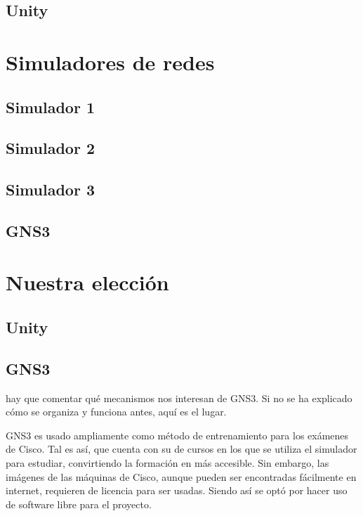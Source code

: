 \subsection{Unity}


\section{Simuladores de redes}

\subsection{Simulador 1}

\subsection{Simulador 2}

\subsection{Simulador 3}

\subsection{GNS3}

\section{Nuestra elección}

\subsection{Unity}

\subsection{GNS3}
hay que comentar qué mecanismos nos interesan de GNS3. Si no se ha explicado cómo se organiza y funciona antes, aquí es el lugar.

GNS3 es usado ampliamente como método de entrenamiento para los exámenes de Cisco. Tal es así, que cuenta con su  de cursos en los que se utiliza el simulador para estudiar, convirtiendo la formación en más accesible. Sin embargo, las imágenes de las máquinas de Cisco, aunque pueden ser encontradas fácilmente en internet, requieren de licencia para ser usadas. Siendo así se optó por hacer uso de software libre para el proyecto. 


